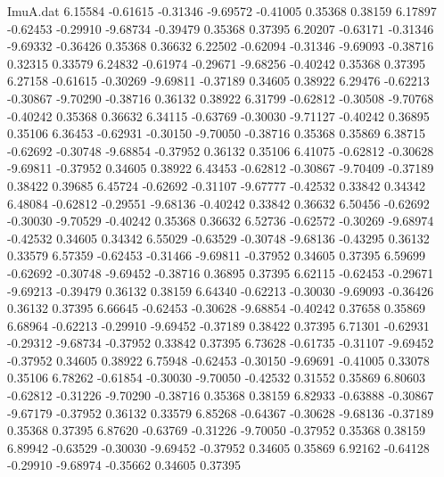 \begin{filecontents}{ImuA.dat}
   6.15584   -0.61615   -0.31346   -9.69572   -0.41005    0.35368    0.38159
   6.17897   -0.62453   -0.29910   -9.68734   -0.39479    0.35368    0.37395
   6.20207   -0.63171   -0.31346   -9.69332   -0.36426    0.35368    0.36632
   6.22502   -0.62094   -0.31346   -9.69093   -0.38716    0.32315    0.33579
   6.24832   -0.61974   -0.29671   -9.68256   -0.40242    0.35368    0.37395
   6.27158   -0.61615   -0.30269   -9.69811   -0.37189    0.34605    0.38922
   6.29476   -0.62213   -0.30867   -9.70290   -0.38716    0.36132    0.38922
   6.31799   -0.62812   -0.30508   -9.70768   -0.40242    0.35368    0.36632
   6.34115   -0.63769   -0.30030   -9.71127   -0.40242    0.36895    0.35106
   6.36453   -0.62931   -0.30150   -9.70050   -0.38716    0.35368    0.35869
   6.38715   -0.62692   -0.30748   -9.68854   -0.37952    0.36132    0.35106
   6.41075   -0.62812   -0.30628   -9.69811   -0.37952    0.34605    0.38922
   6.43453   -0.62812   -0.30867   -9.70409   -0.37189    0.38422    0.39685
   6.45724   -0.62692   -0.31107   -9.67777   -0.42532    0.33842    0.34342
   6.48084   -0.62812   -0.29551   -9.68136   -0.40242    0.33842    0.36632
   6.50456   -0.62692   -0.30030   -9.70529   -0.40242    0.35368    0.36632
   6.52736   -0.62572   -0.30269   -9.68974   -0.42532    0.34605    0.34342
   6.55029   -0.63529   -0.30748   -9.68136   -0.43295    0.36132    0.33579
   6.57359   -0.62453   -0.31466   -9.69811   -0.37952    0.34605    0.37395
   6.59699   -0.62692   -0.30748   -9.69452   -0.38716    0.36895    0.37395
   6.62115   -0.62453   -0.29671   -9.69213   -0.39479    0.36132    0.38159
   6.64340   -0.62213   -0.30030   -9.69093   -0.36426    0.36132    0.37395
   6.66645   -0.62453   -0.30628   -9.68854   -0.40242    0.37658    0.35869
   6.68964   -0.62213   -0.29910   -9.69452   -0.37189    0.38422    0.37395
   6.71301   -0.62931   -0.29312   -9.68734   -0.37952    0.33842    0.37395
   6.73628   -0.61735   -0.31107   -9.69452   -0.37952    0.34605    0.38922
   6.75948   -0.62453   -0.30150   -9.69691   -0.41005    0.33078    0.35106
   6.78262   -0.61854   -0.30030   -9.70050   -0.42532    0.31552    0.35869
   6.80603   -0.62812   -0.31226   -9.70290   -0.38716    0.35368    0.38159
   6.82933   -0.63888   -0.30867   -9.67179   -0.37952    0.36132    0.33579
   6.85268   -0.64367   -0.30628   -9.68136   -0.37189    0.35368    0.37395
   6.87620   -0.63769   -0.31226   -9.70050   -0.37952    0.35368    0.38159
   6.89942   -0.63529   -0.30030   -9.69452   -0.37952    0.34605    0.35869
   6.92162   -0.64128   -0.29910   -9.68974   -0.35662    0.34605    0.37395

\end{filecontents}
